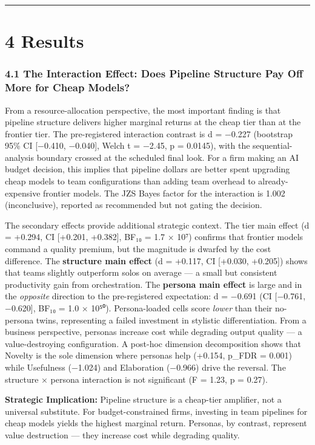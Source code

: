 \documentclass[11pt,a4paper]{article}
\begin{document}
\hrule


\section{4 Results}

\subsubsection{4.1 The Interaction Effect: Does Pipeline Structure Pay Off More for Cheap Models?}

From a resource-allocation perspective, the most important finding is that
pipeline structure delivers higher marginal returns at the cheap tier than at
the frontier tier. The pre-registered interaction contrast is d = −0.227
(bootstrap 95\% CI [−0.410, −0.040], Welch t = −2.45, p = 0.0145), with the
sequential-analysis boundary crossed at the scheduled final look. For a firm
making an AI budget decision, this implies that pipeline dollars are better
spent upgrading cheap models to team configurations than adding team overhead
to already-expensive frontier models. The JZS Bayes factor for the interaction
is 1.002 (inconclusive), reported as recommended but not gating the decision.

The secondary effects provide additional strategic context. The \textit{}tier
main effect\textit{} (d = +0.294, CI [+0.201, +0.382], BF₁₀ = 1.7 × 10⁷) confirms
that frontier models command a quality premium, but the magnitude is dwarfed
by the cost difference. The \textbf{structure main effect} (d = +0.117, CI
[+0.030, +0.205]) shows that teams slightly outperform solos on average — a
small but consistent productivity gain from orchestration. The \textbf{persona main effect} is large and in the \textit{opposite}
direction to the pre-registered expectation: d = −0.691 (CI [−0.761,
−0.620], BF₁₀ = 1.0 × 10⁵⁰). Persona-loaded cells score \textit{lower} than
their no-persona twins, representing a failed investment in stylistic
differentiation. From a business perspective, personas increase cost while
degrading output quality — a value-destroying configuration. A post-hoc dimension decomposition shows that
Novelty is the sole dimension where personas help (+0.154, p\_FDR =
0.001) while Usefulness (−1.024) and Elaboration (−0.966) drive the
reversal. The structure × persona interaction is not significant (F =
1.23, p = 0.27).

\textbf{Strategic Implication:} Pipeline structure is a cheap-tier amplifier,
not a universal substitute. For budget-constrained firms, investing in team
pipelines for cheap models yields the highest marginal return. Personas, by
contrast, represent value destruction — they increase cost while degrading
quality.
\end{document}
